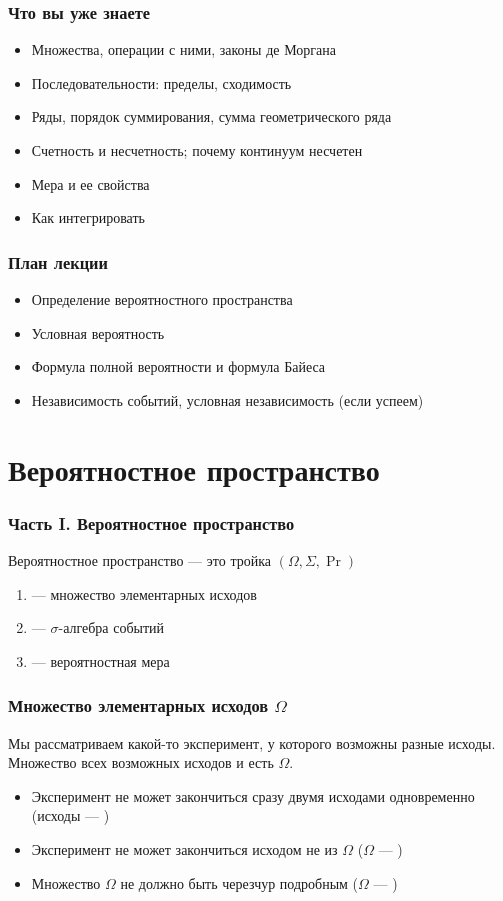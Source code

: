 \documentclass[hyperref=unicode,graphics=pdflatex,13pt,xcolor={usenames,dvipsnames}]{beamer}
\newcommand\hl[1]{{\color{blue}{#1}}}
\newcommand\pitem{\pause\item}
\begin{document}
\begin{frame}
  \frametitle{Что вы уже знаете}
  \begin{itemize}
    \item Множества, операции с ними, законы де Моргана
    \item Последовательности: пределы, сходимость
    \item Ряды, порядок суммирования, сумма геометрического ряда
    \item Счетность и несчетность; почему континуум несчетен
    \item Мера и ее свойства
    \item Как интегрировать
  \end{itemize}
\end{frame}

\begin{frame}
  \frametitle{План лекции}
  \begin{itemize}
    \item Определение вероятностного пространства
    \item Условная вероятность
    \item Формула полной вероятности и формула Байеса
    \item Независимость событий, условная независимость (если успеем)
  \end{itemize}
\end{frame}

\section{Вероятностное пространство}
\begin{frame}
  \frametitle{Часть I. Вероятностное пространство}

  Вероятностное пространство --- это тройка $(\Omega, \Sigma, \Pr)$
  \begin{enumerate}
    \item \hl{$\Omega$} --- множество элементарных исходов 
    \item \hl{$\Sigma$} --- $\sigma$-алгебра событий
    \item \hl{$\Pr$} --- вероятностная мера
  \end{enumerate}
\end{frame}

\begin{frame}
  \frametitle{Множество элементарных исходов $\Omega$}

  Мы рассматриваем какой-то эксперимент, у которого возможны разные исходы. Множество всех возможных исходов и есть $\Omega$.
  \begin{itemize}
    \pitem Эксперимент не может закончиться сразу двумя исходами одновременно (исходы --- \hl{взаимоисключающие})
    \pitem Эксперимент не может закончиться исходом не из $\Omega$ ($\Omega$ --- \hl{полное})
    \pitem Множество $\Omega$ не должно быть черезчур подробным ($\Omega$ --- \hl{неизбыточное})
  \end{itemize}
\end{frame}
\end{document}
